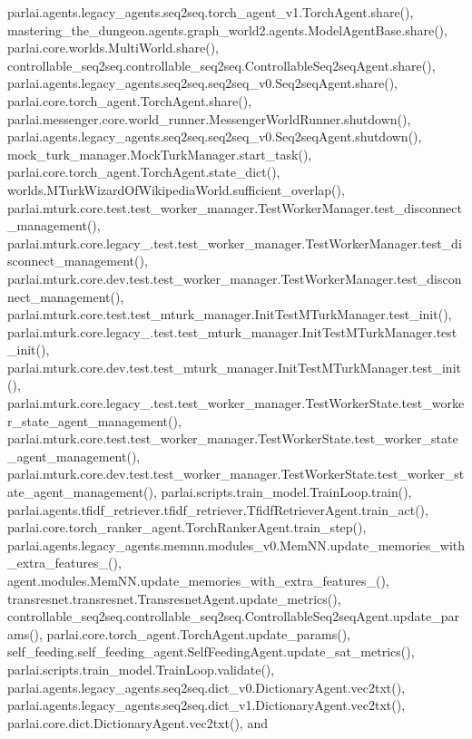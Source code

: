 parlai.\+agents.\+legacy\+\_\+agents.\+seq2seq.\+torch\+\_\+agent\+\_\+v1.\+Torch\+Agent.\+share(), mastering\+\_\+the\+\_\+dungeon.\+agents.\+graph\+\_\+world2.\+agents.\+Model\+Agent\+Base.\+share(), parlai.\+core.\+worlds.\+Multi\+World.\+share(), controllable\+\_\+seq2seq.\+controllable\+\_\+seq2seq.\+Controllable\+Seq2seq\+Agent.\+share(), parlai.\+agents.\+legacy\+\_\+agents.\+seq2seq.\+seq2seq\+\_\+v0.\+Seq2seq\+Agent.\+share(), parlai.\+core.\+torch\+\_\+agent.\+Torch\+Agent.\+share(), parlai.\+messenger.\+core.\+world\+\_\+runner.\+Messenger\+World\+Runner.\+shutdown(), parlai.\+agents.\+legacy\+\_\+agents.\+seq2seq.\+seq2seq\+\_\+v0.\+Seq2seq\+Agent.\+shutdown(), mock\+\_\+turk\+\_\+manager.\+Mock\+Turk\+Manager.\+start\+\_\+task(), parlai.\+core.\+torch\+\_\+agent.\+Torch\+Agent.\+state\+\_\+dict(), worlds.\+M\+Turk\+Wizard\+Of\+Wikipedia\+World.\+sufficient\+\_\+overlap(), parlai.\+mturk.\+core.\+test.\+test\+\_\+worker\+\_\+manager.\+Test\+Worker\+Manager.\+test\+\_\+disconnect\+\_\+management(), parlai.\+mturk.\+core.\+legacy\+\_.\+test.\+test\+\_\+worker\+\_\+manager.\+Test\+Worker\+Manager.\+test\+\_\+disconnect\+\_\+management(), parlai.\+mturk.\+core.\+dev.\+test.\+test\+\_\+worker\+\_\+manager.\+Test\+Worker\+Manager.\+test\+\_\+disconnect\+\_\+management(), parlai.\+mturk.\+core.\+test.\+test\+\_\+mturk\+\_\+manager.\+Init\+Test\+M\+Turk\+Manager.\+test\+\_\+init(), parlai.\+mturk.\+core.\+legacy\+\_.\+test.\+test\+\_\+mturk\+\_\+manager.\+Init\+Test\+M\+Turk\+Manager.\+test\+\_\+init(), parlai.\+mturk.\+core.\+dev.\+test.\+test\+\_\+mturk\+\_\+manager.\+Init\+Test\+M\+Turk\+Manager.\+test\+\_\+init(), parlai.\+mturk.\+core.\+legacy\+\_.\+test.\+test\+\_\+worker\+\_\+manager.\+Test\+Worker\+State.\+test\+\_\+worker\+\_\+state\+\_\+agent\+\_\+management(), parlai.\+mturk.\+core.\+test.\+test\+\_\+worker\+\_\+manager.\+Test\+Worker\+State.\+test\+\_\+worker\+\_\+state\+\_\+agent\+\_\+management(), parlai.\+mturk.\+core.\+dev.\+test.\+test\+\_\+worker\+\_\+manager.\+Test\+Worker\+State.\+test\+\_\+worker\+\_\+state\+\_\+agent\+\_\+management(), parlai.\+scripts.\+train\+\_\+model.\+Train\+Loop.\+train(), parlai.\+agents.\+tfidf\+\_\+retriever.\+tfidf\+\_\+retriever.\+Tfidf\+Retriever\+Agent.\+train\+\_\+act(), parlai.\+core.\+torch\+\_\+ranker\+\_\+agent.\+Torch\+Ranker\+Agent.\+train\+\_\+step(), parlai.\+agents.\+legacy\+\_\+agents.\+memnn.\+modules\+\_\+v0.\+Mem\+N\+N.\+update\+\_\+memories\+\_\+with\+\_\+extra\+\_\+features\+\_\+(), agent.\+modules.\+Mem\+N\+N.\+update\+\_\+memories\+\_\+with\+\_\+extra\+\_\+features\+\_\+(), transresnet.\+transresnet.\+Transresnet\+Agent.\+update\+\_\+metrics(), controllable\+\_\+seq2seq.\+controllable\+\_\+seq2seq.\+Controllable\+Seq2seq\+Agent.\+update\+\_\+params(), parlai.\+core.\+torch\+\_\+agent.\+Torch\+Agent.\+update\+\_\+params(), self\+\_\+feeding.\+self\+\_\+feeding\+\_\+agent.\+Self\+Feeding\+Agent.\+update\+\_\+sat\+\_\+metrics(), parlai.\+scripts.\+train\+\_\+model.\+Train\+Loop.\+validate(), parlai.\+agents.\+legacy\+\_\+agents.\+seq2seq.\+dict\+\_\+v0.\+Dictionary\+Agent.\+vec2txt(), parlai.\+agents.\+legacy\+\_\+agents.\+seq2seq.\+dict\+\_\+v1.\+Dictionary\+Agent.\+vec2txt(), parlai.\+core.\+dict.\+Dictionary\+Agent.\+vec2txt(), and 